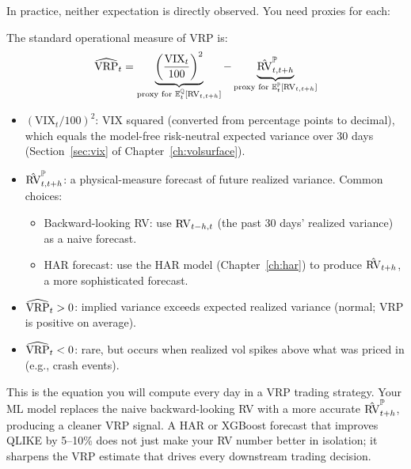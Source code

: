 In practice, neither expectation is directly observed.
You need proxies for each:

\begin{definition}
\label{def:vrp-operational}
The standard operational measure of VRP is:
\begin{equation}
  \widehat{\operatorname{VRP}}_t = \underbrace{\left(\frac{\text{VIX}_t}{100}\right)^2}_{\text{proxy for } \mathbb{E}^{\mathbb{Q}}_t[\operatorname{RV}_{t,t+h}]}
  - \underbrace{\hat{\operatorname{RV}}^{\mathbb{P}}_{t,t+h}}_{\text{proxy for } \mathbb{E}^{\mathbb{P}}_t[\operatorname{RV}_{t,t+h}]}
  \label{eq:vrp-operational}
\end{equation}
\begin{itemize}[nosep]
  \item $(\text{VIX}_t / 100)^2$: VIX squared (converted from percentage points to decimal), which equals the model-free risk-neutral expected variance over 30 days (Section~\ref{sec:vix} of Chapter~\ref{ch:volsurface}).
  \item $\hat{\operatorname{RV}}^{\mathbb{P}}_{t,t+h}$: a physical-measure forecast of future realized variance. Common choices:
    \begin{itemize}[nosep]
      \item Backward-looking RV: use $\operatorname{RV}_{t-h,t}$ (the past 30 days' realized variance) as a naive forecast.
      \item HAR forecast: use the HAR model (Chapter~\ref{ch:har}) to produce $\hat{\operatorname{RV}}_{t+h}$, a more sophisticated forecast.
    \end{itemize}
  \item $\widehat{\operatorname{VRP}}_t > 0$: implied variance exceeds expected realized variance (normal; VRP is positive on average).
  \item $\widehat{\operatorname{VRP}}_t < 0$: rare, but occurs when realized vol spikes above what was priced in (e.g., crash events).
\end{itemize}
\end{definition}

\begin{projectconnection}
This is the equation you will compute every day in a VRP trading strategy. Your ML model replaces the naive backward-looking RV with a more accurate $\hat{\operatorname{RV}}^{\mathbb{P}}_{t+h}$, producing a cleaner VRP signal. A HAR or XGBoost forecast that improves QLIKE by 5--10\% does not just make your RV number better in isolation; it sharpens the VRP estimate that drives every downstream trading decision.
\end{projectconnection}

